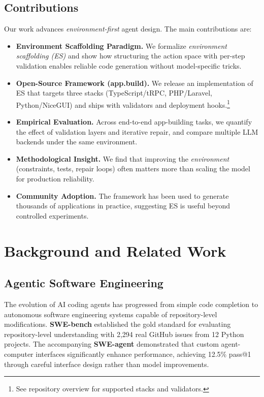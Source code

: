 \documentclass{article}
\begin{document}
\subsection{Contributions}

Our work advances \emph{environment-first} agent design. The main contributions are:

\begin{itemize}
  \item \textbf{Environment Scaffolding Paradigm.} We formalize \emph{environment scaffolding (ES)} and show how structuring the action space with per-step validation enables reliable code generation without model-specific tricks.
  \item \textbf{Open-Source Framework (app.build).} We release an implementation of ES that targets three stacks (TypeScript/tRPC, PHP/Laravel, Python/NiceGUI) and ships with validators and deployment hooks.\footnote{See repository overview for supported stacks and validators.}
  \item \textbf{Empirical Evaluation.} Across end-to-end app-building tasks, we quantify the effect of validation layers and iterative repair, and compare multiple LLM backends under the same environment.
  \item \textbf{Methodological Insight.} We find that improving the \emph{environment} (constraints, tests, repair loops) often matters more than scaling the model for production reliability.
  \item \textbf{Community Adoption.} The framework has been used to generate thousands of applications in practice, suggesting ES is useful beyond controlled experiments.
\end{itemize}

\section{Background and Related Work}
\label{sec:related}

\subsection{Agentic Software Engineering}

The evolution of AI coding agents has progressed from simple code completion to autonomous software engineering systems capable of repository-level modifications. \textbf{SWE-bench} \citep{jimenez2024swe} established the gold standard for evaluating repository-level understanding with 2,294 real GitHub issues from 12 Python projects. The accompanying \textbf{SWE-agent} \citep{yang2024swe} demonstrated that custom agent-computer interfaces significantly enhance performance, achieving 12.5\% pass@1 through careful interface design rather than model improvements.
\end{document}
